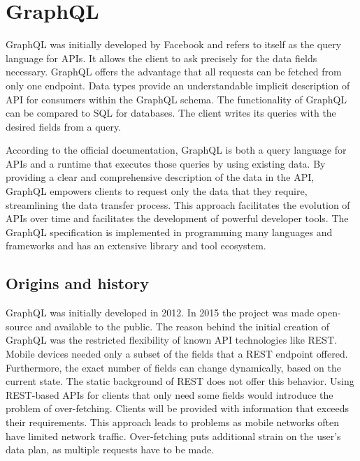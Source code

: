 \section{GraphQL}\label{section:background:graphql}

GraphQL was initially developed by Facebook and refers to itself as the query language for \acp{API}. It allows the client to ask precisely for the data fields necessary. GraphQL offers the advantage that all requests can be fetched from only one endpoint. Data types provide an understandable implicit description of \ac{API} for consumers within the GraphQL schema. \cite{misc:-:background:graphql:graphql-org} The functionality of GraphQL can be compared to \ac{SQL} for databases. The client writes its queries with the desired fields from a query.

\bigskip

\noindent According to the official documentation, GraphQL is both a query language for \acp{API} and a runtime that executes those queries by using existing data. By providing a clear and comprehensive description of the data in the \ac{API}, GraphQL empowers clients to request only the data that they require, streamlining the data transfer process. This approach facilitates the evolution of \acp{API} over time and facilitates the development of powerful developer tools. The GraphQL specification is implemented in programming many languages and frameworks and has an extensive library and tool ecosystem.

\subsection{Origins and history}\label{subsection:background:graphql:origins-and-history}

GraphQL was initially developed in 2012. In 2015 the project was made open-source and available to the public. The reason behind the initial creation of GraphQL was the restricted flexibility of known \ac{API} technologies like \ac{REST}. Mobile devices needed only a subset of the fields that a \ac{REST} endpoint offered. Furthermore, the exact number of fields can change dynamically, based on the current state. The static background of \ac{REST} does not offer this behavior. Using \ac{REST}-based \acp{API} for clients that only need some fields would introduce the problem of over-fetching. Clients will be provided with information that exceeds their requirements. This approach leads to problems as mobile networks often have limited network traffic. Over-fetching puts additional strain on the user's data plan, as multiple requests have to be made. \cite{misc:2015:bryon:background:graphql:graphql-query-language}

